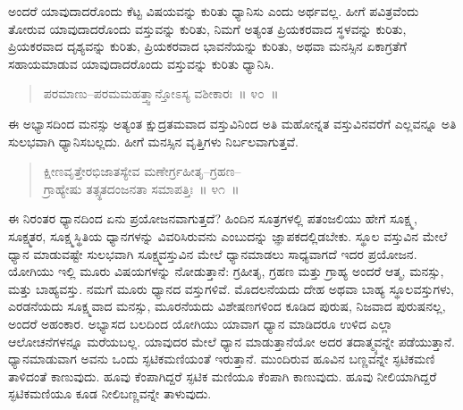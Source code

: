 
\vspace{0.1cm}

ಅಂದರೆ ಯಾವುದಾದರೊಂದು ಕೆಟ್ಟ ವಿಷಯವನ್ನು ಕುರಿತು ಧ್ಯಾನಿಸು ಎಂದು ಅರ್ಥವಲ್ಲ. ಹೀಗೆ ಪವಿತ್ರವೆಂದು ತೋರುವ ಯಾವುದಾದರೊಂದು ವಸ್ತುವನ್ನು ಕುರಿತು, ನಿಮಗೆ ಅತ್ಯಂತ ಪ್ರಿಯಕರವಾದ ಸ್ಥಳವನ್ನು ಕುರಿತು, ಪ್ರಿಯಕರವಾದ ದೃಶ್ಯವನ್ನು ಕುರಿತು, ಪ್ರಿಯಕರವಾದ ಭಾವನೆಯನ್ನು ಕುರಿತು, ಅಥವಾ ಮನಸ್ಸಿನ ಏಕಾಗ್ರತೆಗೆ ಸಹಾಯಮಾಡುವ ಯಾವುದಾದರೊಂದು ವಸ್ತುವನ್ನು ಕುರಿತು ಧ್ಯಾನಿಸಿ. 

\vspace{-0.25cm}

\begin{verse}
ಪರಮಾಣು–ಪರಮಮಹತ್ತ್ವಾನ್ತೋಽಸ್ಯ ವಶೀಕಾರಃ~॥ ೪೦~॥
\end{verse}

\vspace{-0.4cm}


\vspace{0.1cm}

ಈ ಅಭ್ಯಾಸದಿಂದ ಮನಸ್ಸು ಅತ್ಯಂತ ಕ್ಷುದ್ರತಮವಾದ ವಸ್ತುವಿನಿಂದ ಅತಿ ಮಹೋನ್ನತ ವಸ್ತುವಿನವರೆಗೆ ಎಲ್ಲವನ್ನೂ ಅತಿ ಸುಲಭವಾಗಿ ಧ್ಯಾನಿಸಬಲ್ಲದು. ಹೀಗೆ ಮನಸ್ಸಿನ ವೃತ್ತಿಗಳು ನಿರ್ಬಲವಾಗುತ್ತವೆ. 

\vspace{-0.3cm}

\begin{verse}
ಕ್ಷೀಣವೃತ್ತೇರಭಿಜಾತಸ್ಯೇವ ಮಣೇರ್ಗ್ರಹೀತೃ–ಗ್ರಹಣ–\\ಗ್ರಾಹ್ಯೇಷು ತತ್ಸ್ಥತದಂಜನತಾ ಸಮಾಪತ್ತಿಃ~॥ ೪೧~॥
\end{verse}

\vspace{-0.4cm}


\vspace{0.1cm}

ಈ ನಿರಂತರ ಧ್ಯಾನದಿಂದ ಏನು ಪ್ರಯೋಜನವಾಗುತ್ತದೆ? ಹಿಂದಿನ ಸೂತ್ರಗಳಲ್ಲಿ ಪತಂಜಲಿಯು ಹೇಗೆ ಸೂಕ್ಷ್ಮ, ಸೂಕ್ಷ್ಮತರ, ಸೂಕ್ಷ್ಮಸ್ಥಿತಿಯ ಧ್ಯಾನಗಳನ್ನು ವಿವರಿಸಿರುವನು ಎಂಬುದನ್ನು ಜ್ಞಾಪಕದಲ್ಲಿಡಬೇಕು. ಸ್ಥೂಲ ವಸ್ತುವಿನ ಮೇಲೆ ಧ್ಯಾನ ಮಾಡುವಷ್ಟೇ ಸುಲಭವಾಗಿ ಸೂಕ್ಷ್ಮವಸ್ತುವಿನ ಮೇಲೆ ಧ್ಯಾನಮಾಡಲು ಸಾಧ್ಯವಾಗದೆ ಇದರ ಪ್ರಯೋಜನ. ಯೋಗಿಯು ಇಲ್ಲಿ ಮೂರು ವಿಷಯಗಳನ್ನು ನೋಡುತ್ತಾನೆ: ಗ್ರಹೀತೃ, ಗ್ರಹಣ ಮತ್ತು ಗ್ರಾಹ್ಯ ಅಂದರೆ ಆತ್ಮ, ಮನಸ್ಸು, ಮತ್ತು ಬಾಹ್ಯವಸ್ತು. ನಮಗೆ ಮೂರು ಧ್ಯಾನದ ವಸ್ತುಗಳಿವೆ. ಮೊದಲನೆಯದು ದೇಹ ಅಥವಾ ಬಾಹ್ಯ ಸ್ಥೂಲವಸ್ತುಗಳು, ಎರಡನೆಯದು ಸೂಕ್ಷ್ಮವಾದ ಮನಸ್ಸು, ಮೂರನೆಯದು ವಿಶೇಷಣಗಳಿಂದ ಕೂಡಿದ ಪುರುಷ, ನಿಜವಾದ ಪುರುಷನಲ್ಲ, ಅಂದರೆ ಅಹಂಕಾರ. ಅಭ್ಯಾಸದ ಬಲದಿಂದ ಯೋಗಿಯು ಯಾವಾಗ ಧ್ಯಾನ ಮಾಡಿದರೂ ಉಳಿದ ಎಲ್ಲಾ ಆಲೋಚನೆಗಳನ್ನೂ ಮರೆಯಬಲ್ಲ. ಯಾವುದರ ಮೇಲೆ ಧ್ಯಾನ ಮಾಡುತ್ತಾನೆಯೋ ಅದರ ತದಾತ್ಮ್ಯವನ್ನೇ ಪಡೆಯುತ್ತಾನೆ. ಧ್ಯಾನಮಾಡುವಾಗ ಅವನು ಒಂದು ಸ್ಫಟಿಕಮಣಿಯಂತೆ ಇರುತ್ತಾನೆ. ಮುಂದಿರುವ ಹೂವಿನ ಬಣ್ಣವನ್ನೇ ಸ್ಫಟಿಕಮಣಿ ತಾಳಿದಂತೆ ಕಾಣುವುದು. ಹೂವು ಕೆಂಪಾಗಿದ್ದರೆ ಸ್ಫಟಿಕ ಮಣಿಯೂ ಕೆಂಪಾಗಿ ಕಾಣುವುದು. ಹೂವು ನೀಲಿಯಾಗಿದ್ದರೆ ಸ್ಫಟಿಕಮಣಿಯೂ ಕೂಡ ನೀಲಿಬಣ್ಣವನ್ನೇ ತಾಳುವುದು. 

